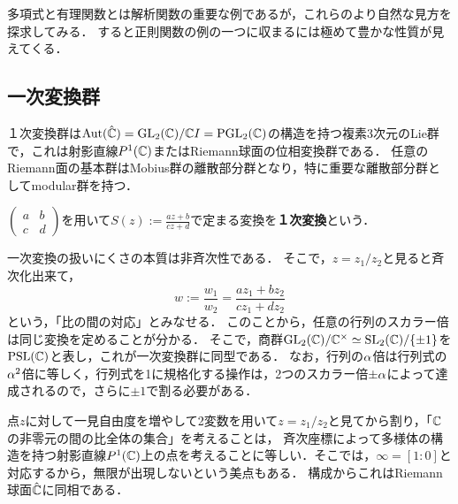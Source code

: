 \documentclass[uplatex, dvipdfmx]{jsreport}
\begin{document}
\begin{tcolorbox}[colframe=ForestGreen, colback=ForestGreen!10!white,breakable,colbacktitle=ForestGreen!40!white,coltitle=black,fonttitle=\bfseries\sffamily,
title=]
    多項式と有理関数とは解析関数の重要な例であるが，これらのより自然な見方を探求してみる．
    すると正則関数の例の一つに収まるには極めて豊かな性質が見えてくる．
\end{tcolorbox}

\subsection{一次変換群}

\begin{tcolorbox}[colframe=ForestGreen, colback=ForestGreen!10!white,breakable,colbacktitle=ForestGreen!40!white,coltitle=black,fonttitle=\bfseries\sffamily,
title=]
    １次変換群は$\mathrm{Aut}(\hat{\mathbb{C}})=\mathrm{GL}_2(\mathbb{C})/\mathbb{C} I=\mathrm{PGL}_2(\mathbb{C})$の構造を持つ複素3次元のLie群で，これは射影直線$P^1(\mathbb{C})$またはRiemann球面の位相変換群である．
    任意のRiemann面の基本群はMobius群の離散部分群となり，特に重要な離散部分群としてmodular群を持つ．
\end{tcolorbox}

\begin{definition}
    $\begin{pmatrix}
        a&b\\c&d
    \end{pmatrix}$を用いて$S(z):=\frac{az+b}{cz+d}$で定まる変換を\textbf{１次変換}という．
\end{definition}
\begin{discussion}
    一次変換の扱いにくさの本質は非斉次性である．
    そこで，$z=z_1/z_2$と見ると斉次化出来て，
    \[w:=\frac{w_1}{w_2}=\frac{az_1+bz_2}{cz_1+dz_2}\]
    という，「比の間の対応」とみなせる．
    このことから，任意の行列のスカラー倍は同じ変換を定めることが分かる．
    そこで，商群$\mathrm{GL}_2(\mathbb{C})/\mathbb{C}^\times\simeq\mathrm{SL}_2(\mathbb{C})/\{\pm1\}$を$\mathrm{PSL}(\mathbb{C})$と表し，これが一次変換群に同型である．
    なお，行列の$\alpha$倍は行列式の$\alpha^2$倍に等しく，行列式を1に規格化する操作は，2つのスカラー倍$\pm\alpha$によって達成されるので，さらに$\pm1$で割る必要がある．

    点$z$に対して一見自由度を増やして2変数を用いて$z=z_1/z_2$と見てから割り，「$\mathbb{C}$の非零元の間の比全体の集合」を考えることは，
    斉次座標によって多様体の構造を持つ射影直線$P^1(\mathbb{C})$上の点を考えることに等しい．そこでは，$\infty=[1:0]$と対応するから，無限が出現しないという美点もある．
    構成からこれはRiemann球面$\hat{\mathbb{C}}$に同相である．
\end{discussion}
\end{document}
